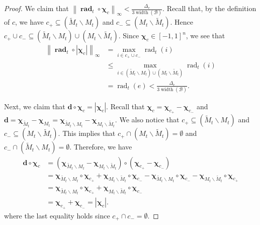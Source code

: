 \documentclass{article}
\newcommand{\B}{\mathcal B}
\newcommand{\del}{\backslash}
\DeclareMathOperator{\rank}{width}
\DeclareMathOperator{\rad}{rad}
\newcommand{\nor}[1]{\left\|#1\right\|}
\renewcommand{\vec}[1]{\boldsymbol{#1}}
\renewcommand{\odot}{\circ}
\begin{document}
\begin{proof}
We claim that $\nor{\vec \rad_t \odot \vec \chi_c}_\infty < \frac{\Delta_e}{3\rank(\B)}$.
Recall that, by the definition of $c$, we have
$c_+\subseteq (\tilde M_t \del M_t)$ and $c_-\subseteq (M_t\del \tilde M_t)$. 
Hence $c_+\cup c_- \subseteq  (\tilde M_t \del M_t)\cup (M_t\del \tilde M_t)$.
Since $\vec \chi_c \in [-1,1]^n$, we see that 
\begin{align}
\nor{\vec \rad_t \odot |\vec \chi_c|}_\infty &= \max_{i\in  c_+\cup c_-} \rad_t(i) \nonumber \\
									    &\le \max_{i\in  (\tilde M_t \del M_t)\cup (M_t\del \tilde M_t)} \rad_t(i)  \nonumber \\
									    &= \rad_t(e) < \frac{\Delta_e}{3\rank(\B)} \label{eq:u-c-1-0-1}.
\end{align}


Next, we claim that $\vec d \odot \vec \chi_c = |\vec \chi_c|$.
Recall that $\vec\chi_c = \vec\chi_{c_+}-\vec\chi_{c_-}$
and $\vec d = \vec \chi_{\tilde M_t}-\vec \chi_{M_t} = \vec\chi_{\tilde M_t\del M_t} - \vec\chi_{M_t\del \tilde M_t}$.
We also notice that $c_+ \subseteq (\tilde M_t \del M_t)$ and $c_- \subseteq (M_t \del \tilde M_t)$.
This implies that $c_+ \cap (M_t \del \tilde M_t) = \emptyset$ and $c_-\cap (\tilde M_t \del M_t) = \emptyset$.
Therefore, we have
\begin{align*}
\vec d \odot \vec \chi_c &= (\vec\chi_{\tilde M_t\del M_t} - \vec\chi_{M_t\del \tilde M_t})\odot(\vec\chi_{c_+}-\vec\chi_{c_-})\\
&= \vec\chi_{\tilde M_t\del M_t}\odot \vec\chi_{c_+}+
   \vec\chi_{M_t \del \tilde M_t}\odot \vec\chi_{c_-}-
   \vec\chi_{\tilde M_t\del M_t}\odot \vec\chi_{c_-}-
   \vec\chi_{M_t\del \tilde M_t}\odot \vec\chi_{c_+}\\
&= \vec\chi_{\tilde M_t\del M_t}\odot \vec\chi_{c_+}+
   \vec\chi_{M_t \del \tilde M_t}\odot \vec\chi_{c_-} \\
&= \vec\chi_{c_+}+\vec\chi_{c_-} =|\vec\chi_c|. 
\end{align*}
where the last equality holds since $c_+\cap c_- =\emptyset$.


\end{proof}
\end{document}
